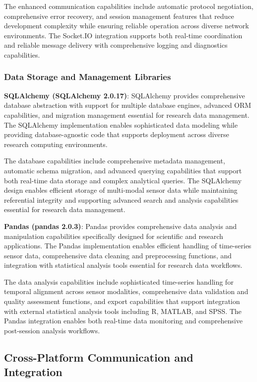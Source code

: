 \documentclass[11pt,a4paper]{report}
\begin{document}
The enhanced communication capabilities include automatic protocol negotiation, comprehensive error recovery, and session management features that reduce development complexity while ensuring reliable operation across diverse network environments. The Socket.IO integration supports both real-time coordination and reliable message delivery with comprehensive logging and diagnostics capabilities.

\subsubsection{Data Storage and Management Libraries}

\noindent \textbf{SQLAlchemy (SQLAlchemy 2.0.17)}: SQLAlchemy provides comprehensive database abstraction with support for multiple database engines, advanced ORM capabilities, and migration management essential for research data management. The SQLAlchemy implementation enables sophisticated data modeling while providing database-agnostic code that supports deployment across diverse research computing environments.

The database capabilities include comprehensive metadata management, automatic schema migration, and advanced querying capabilities that support both real-time data storage and complex analytical queries. The SQLAlchemy design enables efficient storage of multi-modal sensor data while maintaining referential integrity and supporting advanced search and analysis capabilities essential for research data management.

\noindent \textbf{Pandas (pandas 2.0.3)}: Pandas provides comprehensive data analysis and manipulation capabilities specifically designed for scientific and research applications. The Pandas implementation enables efficient handling of time-series sensor data, comprehensive data cleaning and preprocessing functions, and integration with statistical analysis tools essential for research data workflows.

The data analysis capabilities include sophisticated time-series handling for temporal alignment across sensor modalities, comprehensive data validation and quality assessment functions, and export capabilities that support integration with external statistical analysis tools including R, MATLAB, and SPSS. The Pandas integration enables both real-time data monitoring and comprehensive post-session analysis workflows.

\subsection{Cross-Platform Communication and Integration}
\end{document}
